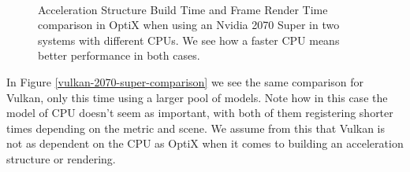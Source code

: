 \begin{figure}
    \\
    \caption{Acceleration Structure Build Time and Frame Render Time comparison in OptiX when using an Nvidia 2070 Super in two systems with different CPUs. We see how a faster CPU means better performance in both cases.}
    \label{optix-2070-super-comparison}
\end{figure}

In Figure \ref{vulkan-2070-super-comparison} we see the same comparison for Vulkan, only this time using a larger pool of models. Note how in this case the model of CPU doesn't seem as important, with both of them registering shorter times depending on the metric and scene. We assume from this that Vulkan is not as dependent on the CPU as OptiX when it comes to building an acceleration structure or rendering.

